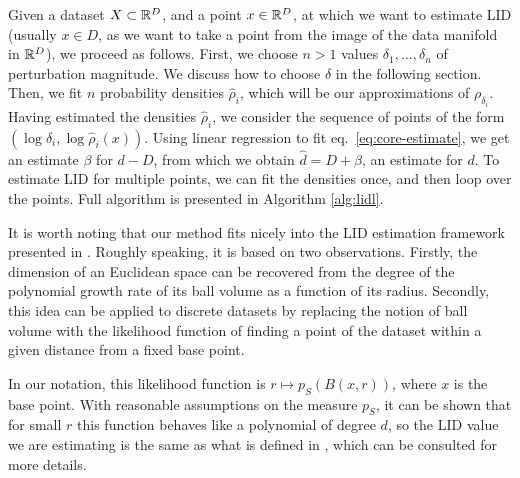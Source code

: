 Given a dataset $X\subset\mathbb{R}^D$, and a point $x\in\mathbb{R}^D$, at which we want to estimate LID (usually $x\in D$, as we want to take a point from the image of the data manifold in $\mathbb{R}^D$), we proceed as follows. First, we choose $n>1$ values $\delta_1, \dots, \delta_n$ of perturbation magnitude. We discuss how to choose $\delta$ in the following section. Then, we fit $n$ probability densities $\hat\rho_i$, which will be our approximations of $\rho_{\delta_i}$. Having estimated the densities $\hat\rho_i$, we consider the sequence of points of the form $(\log \delta_i, \log\hat\rho_i(x))$. Using linear regression to fit eq.~\eqref{eq:core-estimate}, we get an estimate $\beta$ for $d-D$, from which we obtain $\hat{d} = D + \beta$, an estimate for $d$. To estimate LID for multiple points, we can fit the densities once, and then loop over the points. 
Full algorithm is presented in Algorithm \ref{alg:lidl}.

It is worth noting that our method fits nicely into the LID estimation framework presented in \cite{amsaleg2019intrinsic}. Roughly speaking, it is based on two observations. Firstly, the dimension of an Euclidean space can be recovered from the degree of the polynomial growth rate of its ball volume as a function of its radius. Secondly, this idea can be applied to discrete datasets by replacing the notion of ball volume with the likelihood function of finding a point of the dataset within a given distance from a fixed base point. 

In our notation, this likelihood function is $r\mapsto p_S(B(x,r))$, where $x$ is the base point. With reasonable assumptions on the measure $p_S$, it can be shown that for small $r$ this function behaves like a polynomial of degree $d$, so the LID value we are estimating is the same as what is defined in \cite{amsaleg2019intrinsic}, which can be consulted for more details.






  
